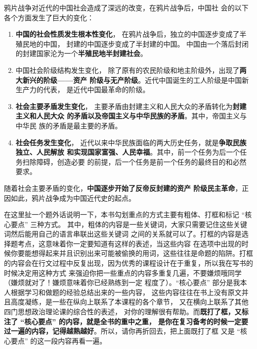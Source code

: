 \documentclass[10pt, UTF8]{book} %
\begin{document}
\begin{mdframed}
    \begin{cmt}
        鸦片战争对近代的中国社会造成了深远的改变，在鸦片战争后，中国社
        会的以下各个方面发生了巨大的变化：
        \begin{enumerate}[label=(\arabic*), itemsep=0pt]
            \item \textbf{中国的社会性质发生根本性变化}，
            在鸦片战争后，独立的中国逐步变成了半殖民地的中国，
            封建的中国逐步变成了半封建的中国。
            中国由一个落后封闭的封建国家沦为一个\textbf{半殖民地半封建社会}。
            \item 中国社会阶级结构发生变化，
            除了原有的农民阶级和地主阶级外，出现了\textbf{两大新兴的阶级——资产
            阶级与无产阶级}。近代中国诞生的工人阶级是中国新生产力的代表，
            是近代中国最革命的阶级。
            \item \textbf{社会主要矛盾发生变化}，
            主要矛盾由封建主义和人民大众的矛盾转化为\textbf{封建主义和人民大众
            的矛盾以及帝国主义与中华民族的矛盾}。其中，帝国主义与中华民
            族的矛盾是最主要的矛盾。
            \item \textbf{社会任务发生变化}，
            近代以来中华民族面临的两大历史任务，就是\textbf{争取民族独立、人民解放
            和实现国家富强、人民幸福}。其中，前一个任务为后一个任务扫除障碍，创造必要
            的前提，后一个任务是前一个任务的最终目的和必然要求。
        \end{enumerate}
        随着社会主要矛盾的变化，\textbf{中国逐步开始了反帝反封建的资产
        阶级民主革命}，正因如此，鸦片战争成为中国近代史的起点。
    \end{cmt}
\end{mdframed}

在这里扯一个题外话说明一下，本书勾划重点的方式主要有粗体、打框和标记 “核心要点” 三种方式。
其中，粗体的内容是一些关键词，大家只需要记住这些关键词然后能用自己的语言串联出这些关键词
之间的关系就可以了。打框的内容是选择题考点，这意味着你一定要知道有这样的表述，当这些内容
在选项中出现的时候你要能想得起来并且识别出来可能被偷换的用词，这些往往是命题的陷阱。打框
的内容会在行文过程中反复出现，因为优秀的课程设计在于重复，所以我在写书的时候决定用这种方式
来强迫你把一些重点的内容多重复几遍，不要嫌烦哦同学（嫌烦就对了！嫌烦意味着你已经熟练到一定
程度了）。“核心要点” 部分是我本人根据学习和做题的经验总结出来的一些内容，
这些内容往往在书上没有原文并且高度凝练，是一些在纵向上联系了本课程的各个章节，
又在横向上联系了其他四门思想政治理论课的综合性的表述，
对你的理解很有帮助。而\textbf{既打了框，又标注了 “核心要点” 的内容，就是全书的重中之重，
是你在复习备考的时候一定要过一遍的内容，记得越熟越好}。所以，请你再折回去，把上面既打了框
又是 “核心要点” 的这一段内容再看一遍。
\end{document}
